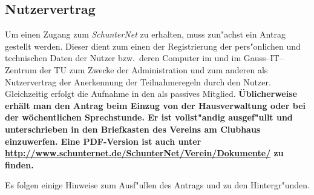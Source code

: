 \subsection{Nutzervertrag}

Um einen Zugang zum \emph{SchunterNet} zu erhalten, muss zun"achst ein
Antrag gestellt werden. Dieser dient zum einen der Registrierung der
pers"onlichen und technischen Daten der Nutzer bzw.\  deren Computer im
\snev und im Gauss--IT--Zentrum der TU zum Zwecke der \glossar Administration und
zum anderen als Nutzervertrag der Anerkennung der Teilnahmeregeln durch den
Nutzer. Gleichzeitig erfolgt die Aufnahme in den \snev als passives Mitglied.
\bf Üblicherweise erhält man den  Antrag beim Einzug von der
Hausverwaltung oder bei der wöchentlichen \glossar Sprechstunde. Er ist vollst"andig ausgef"ullt und
unterschrieben in den Briefkasten des Vereins am Clubhaus einzuwerfen. Eine
PDF-Version ist auch unter
\url{http://www.schunternet.de/SchunterNet/Verein/Dokumente/} zu
finden.

\rm Es folgen einige Hinweise zum Ausf"ullen des Antrags und zu den Hintergr"unden.


